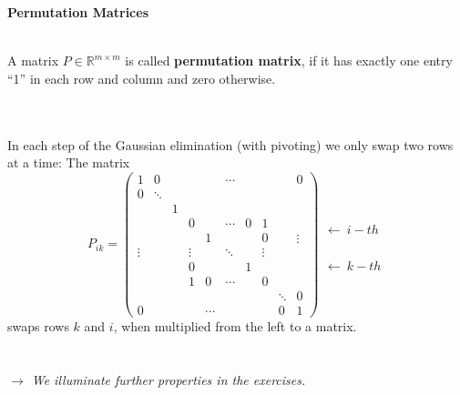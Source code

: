 \begin{frame}
	\textbf{Permutation Matrices}\\~\\
	\begin{defi} \label{def:PermutationMatrix}
		{A matrix $P\in\mathbb{R}^{m\times m}$ is called \textbf{permutation matrix}, if it has exactly one entry ``1'' in each row and column and zero otherwise.}
	\end{defi}
 ~\\
		~\\
		In each step of the Gaussian elimination (with pivoting) we only swap two rows at a time: The matrix
		$$
		P_{ik}=\begin{pmatrix}
		1     &0     &~     &~     &~     &\cdots&~     &~     &~     &0\\
		0     &\ddots&~     &~     &~     &~     &~     &~     &~     &~\\
		~     &~     &1     &~     &~     &~     &~     &~     &~     &~\\
		~     &~     &~     &0     &~     &\cdots&0     &1     &~     &~\\
		~     &~     &~     &~     &1     &~     &~     &0     &~     &\vdots\\
		\vdots&~     &~     &\vdots&~     &\ddots&~     &\vdots&~     &~\\
		~     &~     &~     &0     &~     &~     &1     &~     &~     &~\\
		~     &~     &~     &1     &0     &\cdots&~     &0     &~     &~\\
		~     &~     &~     &~     &~     &~     &~     &~     &\ddots     &0\\
		0     &~     &~     &~     &\cdots&~     &~     &~     &0     &1
		\end{pmatrix}
		\begin{matrix}
		~\\~\\~\\\leftarrow~i-th\\~\\~\\~\\~\\\leftarrow~k-th\\~\\~
		\end{matrix}
		$$
		swaps rows $k$ and $i$, when multiplied from the left to a matrix.\\~\\~\\
\textit{$\rightarrow$ We illuminate further properties in the exercises.}
 
\end{frame}

